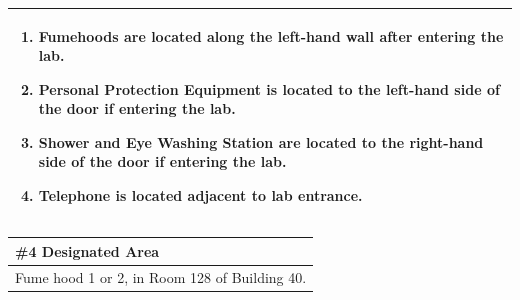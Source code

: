 \documentclass{article}
\begin{document}
\begin{center}
\begin{longtable}{ |p{\textwidth}| }
\begin{enumerate}
	\item \textbf{Fumehoods} are located along the left-hand wall after entering the lab.
	\item \textbf{Personal Protection Equipment} is located to the left-hand side of the door if entering the lab.
	\item \textbf{Shower and Eye Washing Station} are located to the right-hand side of the door if entering the lab.
	\item \textbf{Telephone} is located adjacent to lab entrance.
\end{enumerate}
\\  
\hline      
\end{longtable}
\end{center}

\begin{center}
\begin{tabular}{ |p{\textwidth}| }
\hline
\cellcolor{gray!25} \#4 \textbf{Designated Area} \\
\hline
Fume hood 1 or 2, in Room 128 of Building 40. \\ 
\hline
\end{tabular}
\end{center}
\end{document}
